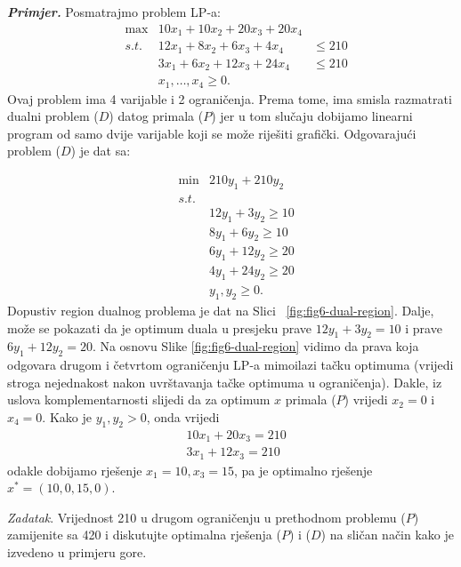 \documentclass[a4paper, utf8, 11pt, colorlinks]{book}
\begin{document}
\emph{\textbf{Primjer.}} Posmatrajmo problem LP-a:
$$\begin{array}{llll}
   &\max                     &10 x_1 + 10 x_2 + 20 x_3 + 20 x_4  & \\
   &{s.t. }      &12 x_1 + 8 x_2  + 6 x_3  + 4 x_4   & \leq 210 \\
    &                        &3 x_1 + 6 x_2   + 12 x_3 + 24 x_4 & \leq 210 \\
     &                       & x_1,\ldots, x_4 \geq 0.                                 &
\end{array}
$$
Ovaj problem ima 4 varijable i 2 ograničenja. Prema tome, ima smisla razmatrati dualni problem  ($D$)  datog primala  ($P$)  jer u tom slučaju dobijamo linearni program od samo dvije varijable koji se može riješiti grafički.  Odgovarajući problem ($D$) je dat sa:

$$\begin{array}{lll}
    &\min                    &  210 y_1 + 210 y_2      \\
    &{s.t. }     &  \\
    &            &  12 y_1  + 3   y_2 \geq 10 \\
    &                        &  8  y_1 + 6    y_2 \geq 10 \\
    &                        &  6 y_1 + 12 y_2  \geq 20 \\
    &                        &  4 y_1 + 24 y_2  \geq 20 \\
    &                        &  y_1, y_2 \geq 0.
\end{array}$$
Dopustiv region dualnog problema je dat na Slici~ \ref{fig:fig6-dual-region}. %
Dalje, može se pokazati da je optimum duala u presjeku prave $12 y_1 + 3 y_2 = 10$ i prave $6y_1 + 12 y_2 = 20$. Na osnovu Slike \ref{fig:fig6-dual-region} vidimo da   prava koja odgovara drugom i četvrtom ograničenju LP-a mimoilazi tačku optimuma (vrijedi stroga nejednakost nakon uvrštavanja tačke optimuma u ograničenja). Dakle, iz uslova komplementarnosti slijedi da za optimum $x$ primala  ($P$)  vrijedi $x_2 = 0$ i $x_4 = 0$.  Kako je $y_1, y_2 > 0$, onda vrijedi 
\begin{align}
    &10 x_1 + 20 x_3 = 210 \nonumber \\
    & 3x_1 + 12 x_3  = 210 \nonumber
\end{align}
odakle dobijamo rješenje $x_1 = 10, x_3 = 15$, pa je optimalno rješenje $x^* = (10, 0, 15, 0)$.

\emph{Zadatak}. Vrijednost 210 u drugom ograničenju u prethodnom problemu  ($P$)  zamijenite sa 420 i diskutujte optimalna rješenja  ($P$)  i  ($D$)  na sličan način kako je izvedeno  u primjeru gore.
\end{document}
